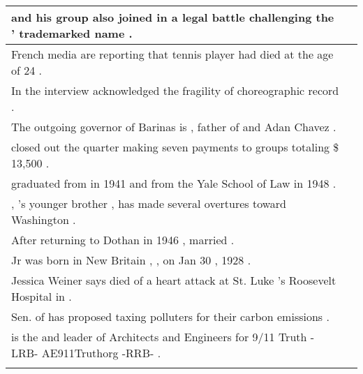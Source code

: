 \begin{longtable}{p{} P{1,3cm} }
\hline
{}  {\underline{} and his group also joined in a legal battle challenging the \underline{} ' trademarked name .} &    \\ 
\hline
{}  {French media are reporting that \underline{} tennis player \underline{} had died at the age of 24 .} &    \\ 
\hline
{}  {In the interview \underline{} acknowledged the fragility of \underline{} choreographic record .} &    \\ 
\hline
{}  {The outgoing governor of Barinas is \underline{} , father of \underline{} and Adan Chavez .} &    \\ 
\hline
{}  {\underline{} closed out the quarter making seven payments to \underline{} groups totaling \$ 13,500 .} &    \\ 
\hline
{}  {\underline{} graduated from \underline{} in 1941 and from the Yale School of Law in 1948 .} &    \\ 
\hline
{}  {\underline{} , \underline{} 's younger brother , has made several overtures toward Washington .} &    \\ 
\hline
{}  {After returning to Dothan in 1946 , \underline{} married \underline{} .} &    \\ 
\hline
{}  {\underline{} Jr was born in New Britain , \underline{} , on Jan 30 , 1928 .} &    \\ 
\hline
{}  {Jessica Weiner says \underline{} died of a heart attack at St. Luke 's Roosevelt Hospital in \underline{} .} &    \\ 
\hline
{}  {Sen. \underline{} of \underline{} has proposed taxing polluters for their carbon emissions .} &    \\ 
\hline
{}  {\underline{} is the \underline{} and leader of Architects and Engineers for 9/11 Truth -LRB- AE911Truthorg -RRB- .} &    \\ 
\hline


\label{table02:tacred}
\end{longtable} 